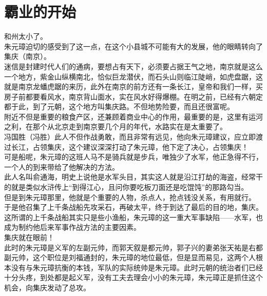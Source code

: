 \section{霸业的开始}
\ifnum{}
	\begin{multicols}{\theparacolNo}
\fi
和州太小了。\\

朱元璋迫切的感受到了这一点，在这个小县城不可能有大的发展，他的眼睛转向了集庆（南京）。\\

迷信是封建时代人们的通病，要想占有天下，必须要占据王气之地，南京就是这么一个地方，紫金山纵横南北，恰似巨龙潜伏，而石头山则临江陡峭，如虎盘踞，这就是南京龙蟠虎踞的来历，此外在南京的前方还有一条长江，皇帝和我们一样，买房子前都要看风水，南京背山面水，实在风水好得爆棚。在明之前，已经有六朝定都于此，到了元朝，这个地方叫集庆路。不但地势险要，而且还很富呢。\\

附近不但是重要的粮食产区，还兼顾着商业中心的作用，最重要的是，这里有运河之利，在那个从北京走到南京要几个月的年代，水路实在是太重要了。\\

冯国胜（冯胜）此人不但作战勇敢，而且非常有远见，他向朱元璋建议，应立即渡过长江，占领集庆，这个建议深深打动了朱元璋，他下定了决心，占领集庆！\\

可是船呢，朱元璋的这班人马不是骑兵就是步兵，唯独少了水军，他正急得不行，一个人的到来带给了他解决的方法。\\

此人名叫俞通海，明史上说他是水军头目，其实这人就是沿江打劫的海盗，经常干的就是类似水浒传上“到得江心，且问你要吃板刀面还是吃馄饨”的那路勾当。\\

但是到朱元璋那里，他就是个重要的人物，杀点人，抢点钱没关系，有用就行。\\

于是他召集了上千条战船先攻采石，再破太平，终于到达了最后的目的地，集庆。\\

这所谓的上千条战船其实只是些小渔船，朱元璋的这一重大军事缺陷——水军，也成为制约他后来军事作战方法的主要因素。\\

集庆就在眼前！\\

此时的朱元璋是义军的左副元帅，而郭天叙是都元帅，郭子兴的妻弟张天祐是右都副元帅，这个职位是刘福通封的，朱元璋的地位最低，但是显而易见，这两个人根本没有与朱元璋抗衡的本钱，军队的实际统帅是朱元璋。此时元朝的统治者们已经十分头疼，到处都是起义军，没有工夫去理会小小的朱元璋，朱元璋正是抓住这个机会，向集庆发动了总攻。\\


\end{multicols}
